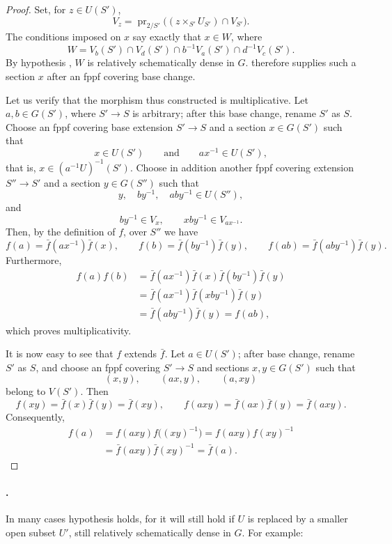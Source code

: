 \begin{proof}
Set, for \(z\in U(S')\),
\[
  V_z=
  \operatorname{pr}_{2/S'}
  \bigl((z\times_{S'}U_{S'})\cap V_{S'}\bigr).
\]
The conditions imposed on \(x\) say exactly that \(x\in W\), where
\[
  W=
  V_b(S')\cap V_d(S')\cap
  b^{-1}V_a(S')\cap d^{-1}V_c(S').
\]
By hypothesis \textup{}, \(W\) is relatively schematically
dense in \(G\).  therefore supplies such a section
\(x\) after an fppf covering base change.

Let us verify that the morphism thus constructed is multiplicative.
Let \(a,b\in G(S')\), where \(S'\to S\) is arbitrary; after this
base change, rename \(S'\) as \(S\). Choose an fppf covering base
extension \(S'\to S\) and a section \(x\in G(S')\) such that
\[
  x\in U(S')
  \qquad\text{and}\qquad
  ax^{-1}\in U(S'),
\]
that is, \(x\in(a^{-1}U)^{-1}(S')\). Choose in addition another
fppf covering extension \(S''\to S'\) and a section
\(y\in G(S'')\) such that
\[
  y,\quad by^{-1},\quad aby^{-1}\in U(S''),
\]
and
\[
  by^{-1}\in V_x,
  \qquad
  xby^{-1}\in V_{ax^{-1}}.
\]
Then, by the definition of \(f\), over \(S''\) we have
\[
  f(a)=\bar f(ax^{-1})\bar f(x),\qquad
  f(b)=\bar f(by^{-1})\bar f(y),\qquad
  f(ab)=\bar f(aby^{-1})\bar f(y).
\]
Furthermore,
\[
\begin{aligned}
  f(a)f(b)
    &=\bar f(ax^{-1})\bar f(x)\bar f(by^{-1})\bar f(y)\\
    &=\bar f(ax^{-1})\bar f(xby^{-1})\bar f(y)\\
    &=\bar f(aby^{-1})\bar f(y)
     =f(ab),
\end{aligned}
\]
which proves multiplicativity.

It is now easy to see that \(f\) extends \(\bar f\). Let
\(a\in U(S')\); after base change, rename \(S'\) as \(S\), and choose
an fppf covering \(S'\to S\) and sections \(x,y\in G(S')\) such that
\[
  (x,y),\qquad (ax,y),\qquad (a,xy)
\]
belong to \(V(S')\). Then
\[
  f(xy)=\bar f(x)\bar f(y)=\bar f(xy),
  \qquad
  f(axy)=\bar f(ax)\bar f(y)=\bar f(axy).
\]
Consequently,
\[
\begin{aligned}
  f(a)
    &=f(axy)f\bigl((xy)^{-1}\bigr)
     =f(axy)f(xy)^{-1}\\
    &=\bar f(axy)\bar f(xy)^{-1}
     =\bar f(a).
\end{aligned}
\]
\end{proof}

\paragraph{.}
In many cases hypothesis \textup{} holds, for it will still
hold if \(U\) is replaced by a smaller open subset \(U'\), still
relatively schematically dense in \(G\). For example:

